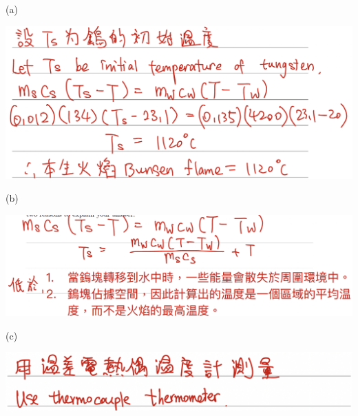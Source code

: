 {\begin{parts}
    \end{parts}
}{
    \sol
    \par (a){\par\centering\includegraphics[width=\textwidth]{./img/ch2_shc_lq_2024-05-16-10-43-24.png}\par}
    \par (b){\par\centering\includegraphics[width=\textwidth]{./img/ch2_shc_lq_2024-05-16-10-43-46.png}\par}
    \par (c){\par\centering\includegraphics[width=\textwidth]{./img/ch2_shc_lq_2024-05-16-10-44-11.png}\par}
}
